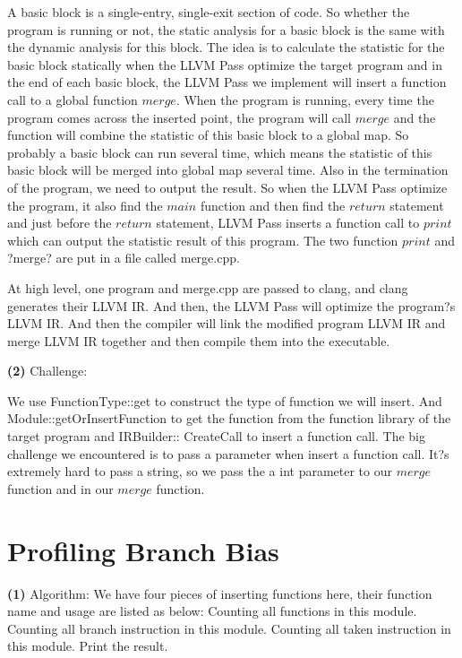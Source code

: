 \documentclass{article}
\renewcommand{\part}[1] {\vspace{.10in} {\bf (#1)}}
\begin{document}
A basic block is a single-entry, single-exit section of code. So whether the program is running or not, the static analysis for a basic block is the same with the dynamic analysis for this block. The idea is to calculate the statistic for the basic block statically when the LLVM Pass optimize the target program and in the end of each basic block, the LLVM Pass we implement will insert a function call to a global function $merge$. When the program is running, every time the program comes across the inserted point, the program will call $merge$ and the function will combine the statistic of this basic block to a global map. So probably a basic block can run several time, which means the statistic of this basic block will be merged into global map several time. Also in the termination of the program, we need to output the result. So when the LLVM Pass optimize the program, it also find the $main$ function and then find the $return$ statement and just before the $return$ statement, LLVM Pass inserts a function call to $print$ which can output the statistic result of this program. The two function $print$ and ?merge? are put in a file called merge.cpp.

At high level, one program and merge.cpp are passed to clang, and clang generates their LLVM IR. And then, the LLVM Pass will optimize the {program?s} LLVM IR. And then the compiler will link the modified program LLVM IR and merge LLVM IR together and then compile them into the executable.


\part{2} Challenge:

We use FunctionType::get to construct the type of function we will insert. And Module::getOrInsertFunction to get the function from the function library of the target program and IRBuilder:: CreateCall to insert a function call. The big challenge we encountered is to pass a parameter when insert a function call. It?s extremely hard to pass a string, so we pass the a int parameter to our $merge$ function and in our $merge$ function.


\section{Profiling Branch Bias}


\part{1} Algorithm:
We have four pieces of inserting functions here, their function name and usage are listed as below:
Counting all functions in this module.
Counting all branch instruction in this module.
Counting all taken instruction in this module.
Print the result.
\end{document}

